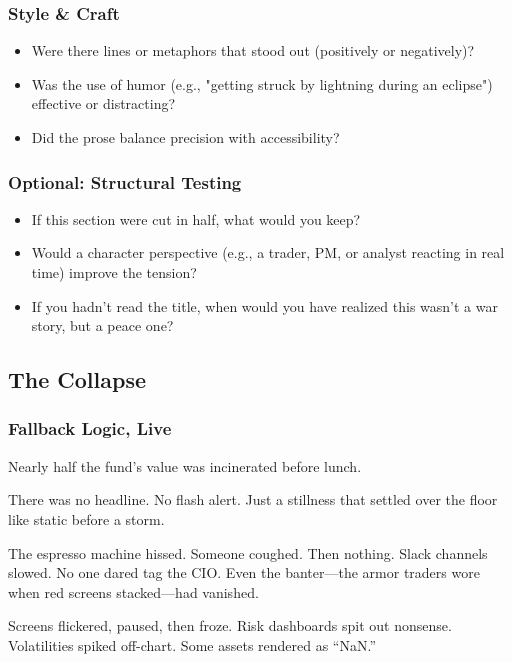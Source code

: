 \subsubsection{Style \& Craft}
\begin{itemize}
  \item Were there lines or metaphors that stood out (positively or negatively)?
  \item Was the use of humor (e.g., "getting struck by lightning during an eclipse") effective or distracting?
  \item Did the prose balance precision with accessibility?
\end{itemize}

\subsubsection{Optional: Structural Testing}
\begin{itemize}
  \item If this section were cut in half, what would you keep?
  \item Would a character perspective (e.g., a trader, PM, or analyst reacting in real time) improve the tension?
  \item If you hadn’t read the title, when would you have realized this wasn’t a war story, but a peace one?
\end{itemize}




\subsection{The Collapse}

\subsubsection{Fallback Logic, Live}


Nearly half the fund’s value was incinerated before lunch.

There was no headline. No flash alert.
Just a stillness that settled over the floor like static before a storm.

The espresso machine hissed. Someone coughed. Then nothing.
Slack channels slowed. No one dared tag the CIO.
Even the banter—the armor traders wore when red screens stacked—had vanished.

Screens flickered, paused, then froze.
Risk dashboards spit out nonsense.
Volatilities spiked off-chart. Some assets rendered as “NaN.”


